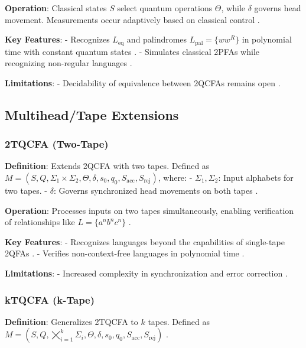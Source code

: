 \textbf{Operation}: Classical states \( S \) select quantum operations \( \Theta \), while \( \delta \) governs head movement. Measurements occur adaptively based on classical control \cite{ambainis2002quantum}.

\textbf{Key Features}:
- Recognizes \( L_{\text{eq}} \) and palindromes \( L_{\text{pal}} = \{ww^R\} \) in polynomial time with constant quantum states \cite{ambainis2002quantum}.
- Simulates classical 2PFAs while recognizing non-regular languages \cite{zheng2012one}.

\textbf{Limitations}: 
- Decidability of equivalence between 2QCFAs remains open \cite{zheng2012one}.

\subsection{Multihead/Tape Extensions}
\label{subsec:multihead-tape}

\subsubsection{2TQCFA (Two-Tape)}
\label{sssec:2tqcfa}

\textbf{Definition}: Extends 2QCFA with two tapes. Defined as \( M = (S, Q, \Sigma_1 \times \Sigma_2, \Theta, \delta, s_0, q_0, S_{\text{acc}}, S_{\text{rej}}) \), where:
- \( \Sigma_1, \Sigma_2 \): Input alphabets for two tapes.
- \( \delta \): Governs synchronized head movements on both tapes \cite{zheng2012two}.

\textbf{Operation}: Processes inputs on two tapes simultaneously, enabling verification of relationships like \( L = \{a^n b^n c^n\} \) \cite{zheng2012two}.

\textbf{Key Features}:
- Recognizes languages beyond the capabilities of single-tape 2QFAs \cite{zheng2012two}.
- Verifies non-context-free languages in polynomial time \cite{zheng2012two}.

\textbf{Limitations}: 
- Increased complexity in synchronization and error correction \cite{zheng2012two}.

\subsubsection{kTQCFA (k-Tape)}
\label{sssec:ktqcfa}

\textbf{Definition}: Generalizes 2TQCFA to \( k \) tapes. Defined as \( M = (S, Q, \bigtimes_{i=1}^k \Sigma_i, \Theta, \delta, s_0, q_0, S_{\text{acc}}, S_{\text{rej}}) \) \cite{zheng2012two}.

